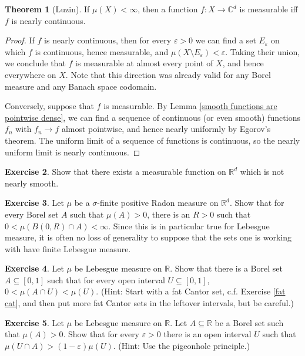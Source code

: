 \documentclass[12pt]{book}
\newcommand{\RR}{\mathbb{R}}
\newcommand{\CC}{\mathbb{C}}
\theoremstyle{definition}
\newtheorem{theorem}{Theorem}[section]
\newtheorem{exercise}[theorem]{Exercise}
\begin{document}
\begin{theorem}[Luzin]
If $\mu(X) < \infty$, then a function $f: X \to \CC^d$ is measurable iff $f$ is nearly continuous.
\end{theorem}
\begin{proof}
If $f$ is nearly continuous, then for every $\varepsilon > 0$ we can find a set $E_\varepsilon$ on which $f$ is continuous, hence measurable, and $\mu(X \setminus E_\varepsilon) < \varepsilon$.
Taking their union, we conclude that $f$ is measurable at almost every point of $X$, and hence everywhere on $X$.
Note that this direction was already valid for any Borel measure and any Banach space codomain.

Conversely, suppose that $f$ is measurable.
By Lemma \ref{smooth functions are pointwise dense}, we can find a sequence of continuous (or even smooth) functions $f_n$ with $f_n \to f$ almost pointwise, and hence nearly uniformly by Egorov's theorem.
The uniform limit of a sequence of functions is continuous, so the nearly uniform limit is nearly continuous.
\end{proof}

\begin{exercise}
Show that there exists a measurable function on $\RR^d$ which is not nearly smooth.
\end{exercise}

\begin{exercise}
Let $\mu$ be a $\sigma$-finite positive Radon measure on $\RR^d$.
Show that for every Borel set $A$ such that $\mu(A) > 0$, there is an $R > 0$ such that $0 < \mu(B(0, R) \cap A) < \infty$.
Since this is in particular true for Lebesgue measure, it is often no loss of generality to suppose that the sets one is working with have finite Lebesgue measure.
\end{exercise}

\begin{exercise}
Let $\mu$ be Lebesgue measure on $\RR$.
Show that there is a Borel set $A \subseteq [0, 1]$ such that for every open interval $U \subseteq [0, 1]$, $0 < \mu(A \cap U) < \mu(U)$.
(Hint: Start with a fat Cantor set, c.f. Exercise \ref{fat cat}, and then put more fat Cantor sets in the leftover intervals, but be careful.)
\end{exercise}

\begin{exercise}
Let $\mu$ be Lebesgue measure on $\RR$.
Let $A \subseteq \RR$ be a Borel set such that $\mu(A) > 0$.
Show that for every $\varepsilon > 0$ there is an open interval $U$ such that $\mu(U \cap A) > (1 - \varepsilon)\mu(U)$.
(Hint: Use the pigeonhole principle.)
\end{exercise}
\end{document}
